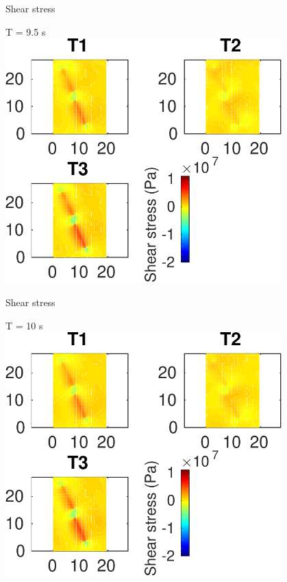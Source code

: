 \documentclass{beamer}
\begin{document}
\begin{frame}
 {Shear stress}
 
 \centering \Large T = 9.5 s\\
 \includegraphics[width=0.8\textwidth]{images/horizontal_00101}
 
\end{frame}

\begin{frame}
 {Shear stress}
 
 \centering \Large T = 10 s\\
 \includegraphics[width=0.8\textwidth]{images/horizontal_00106}
 
\end{frame}
\end{document}
